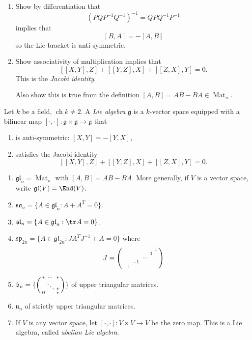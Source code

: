 \documentclass[a4paper]{article}
\DeclareMathOperator{\Mat}{Mat}
\newcommand*{\Lie}[1]{\mathfrak{#1}} %
\DeclareMathOperator{\cha}{ch} %
\begin{document}
\begin{ex}\leavevmode
  \begin{enumerate}
  \item Show by differentiation that
    \[
      (PQP^{-1}Q^{-1})^{-1} = QPQ^{-1}P^{-1}
    \]
    implies that
    \[
      [B, A] = -[A, B]
    \]
    so the Lie bracket is anti-symmetric.
  \item Show associativity of multiplication implies that
    \[
      [[X, Y], Z] + [[Y, Z], X] + [[Z, X], Y] = 0.
    \]
    This is the \emph{Jacobi identity}.

    Also show this is true from the definition \([A, B] = AB - BA \in \Mat_n\).
  \end{enumerate}
\end{ex}

\begin{definition}
  Let \(k\) be a field, \(\cha k \neq 2\). A \emph{Lie algebra} \(\Lie g\) is a \(k\)-vector space equipped with a bilinear map \([\cdot, \cdot]: \Lie g \times \Lie g \to \Lie g\) that
  \begin{enumerate}
  \item is anti-symmetric: \([X, Y] = - [Y, X]\),
  \item satisfies the Jacobi identity
    \[
      [[X, Y], Z] + [[Y, Z], X] + [[Z, X], Y] = 0.
    \]
  \end{enumerate}
\end{definition}

\begin{eg}\leavevmode
  \begin{enumerate}
  \item \(\Lie{gl}_n = \Mat_n\) with \([A, B] = AB - BA\). More generally, if \(V\) is a vector space, write \(\Lie{gl}(V) = \End(V)\).
  \item \(\Lie{so}_n = \{A \in \Lie{gl}_n: A + A^T = 0\}\).
  \item \(\Lie{sl}_n = \{A \in \Lie{gl}_n: \tr A = 0\}\).
  \item \(\Lie{sp}_{2n} = \{A \in \Lie{gl}_{2n}: JA^TJ^{-1} + A = 0\}\) where
    \[
      J =
      \begin{psmallmatrix}
        & & & & & 1 \\
        & & & & 1 \\
        & & & \cdots \\
        & -1 \\
        -1
      \end{psmallmatrix}
    \]
  \item \(\Lie{b}_n = \{
    \begin{psmallmatrix}
      * & \cdots & * \\
      & \ddots & * \\
      0 & & *
    \end{psmallmatrix}
    \}
    \) of upper triangular matrices.
  \item \(\Lie u_n\) of strictly upper triangular matrices.
  \item If \(V\) is any vector space, let \([\cdot, \cdot]: V \times V \to V\) be the zero map. This is a Lie algebra, called \emph{abelian Lie algebra}.
  \end{enumerate}
\end{eg}
\end{document}
